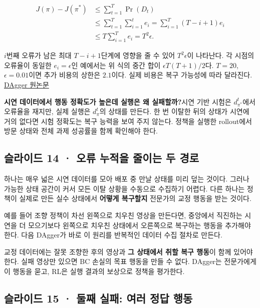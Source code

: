 \documentclass[11pt,a4paper]{article}
\begin{document}
\[
\begin{aligned}
J(\pi)-J(\pi^*)
&\le\sum_{t=1}^{T}\Pr(D_t)\\
&\le\sum_{t=1}^{T}\sum_{i=1}^{t}e_i
=\sum_{i=1}^{T}(T-i+1)e_i\\
&\le T\sum_{i=1}^{T}e_i=T^2\epsilon.
\end{aligned}
\]

$i$번째 오류가 남은 최대 $T-i+1$단계에 영향을 줄 수 있어 $T^2\epsilon$이 나타난다. 각 시점의 오류율이 동일한 $e_i=\epsilon$인 예에서는 위 식의 중간 합이 $\epsilon T(T+1)/2$다. $T=20$, $\epsilon=0.01$이면 추가 비용의 상한은 $2.1$이다. 실제 비용은 복구 가능성에 따라 달라진다. \href{https://proceedings.mlr.press/v15/ross11a/ross11a.pdf}{DAgger 원논문}\par

\par\medskip\noindent\textbf{시연 데이터에서 행동 정확도가 높은데 실행은 왜 실패할까?}\quad 시연 기반 시험은 $d_{\pi^*}^t$에서 오류율을 재지만, 실제 실행은 $d_\pi^t$의 상태를 만든다. 한 번 이탈한 뒤의 상태가 시연에 거의 없다면 시험 정확도는 복구 능력을 보여 주지 않는다. 정책을 실행한 rollout에서 방문 상태와 전체 과제 성공률을 함께 확인해야 한다.\par

\subsection{슬라이드 14 · 오류 누적을 줄이는 두 경로}

하나는 매우 넓은 시연 데이터를 모아 배포 중 만날 상태를 미리 덮는 것이다. 그러나 가능한 상태 공간이 커서 모든 이탈 상황을 수동으로 수집하기 어렵다. 다른 하나는 정책이 실제로 만든 실수 상태에서 \textbf{어떻게 복구할지} 전문가의 교정 행동을 받는 것이다.\par

예를 들어 조향 정책이 차선 왼쪽으로 치우친 영상을 만든다면, 중앙에서 직진하는 시연을 더 모으기보다 왼쪽으로 치우친 상태에서 오른쪽으로 복구하는 행동을 추가해야 한다. 다음 DAgger가 바로 이 원리를 반복적인 데이터 수집 절차로 만든다.\par

교정 데이터에는 잘못 조향한 후의 영상과 \textbf{그 상태에서 취할 복구 행동}이 함께 있어야 한다. 실패 영상만 있으면 BC 손실의 목표 행동을 만들 수 없다. DAgger는 전문가에게 이 행동을 묻고, RL은 실행 결과의 보상으로 정책을 평가한다.\par

\subsection{슬라이드 15 · 둘째 실패: 여러 정답 행동}
\end{document}
